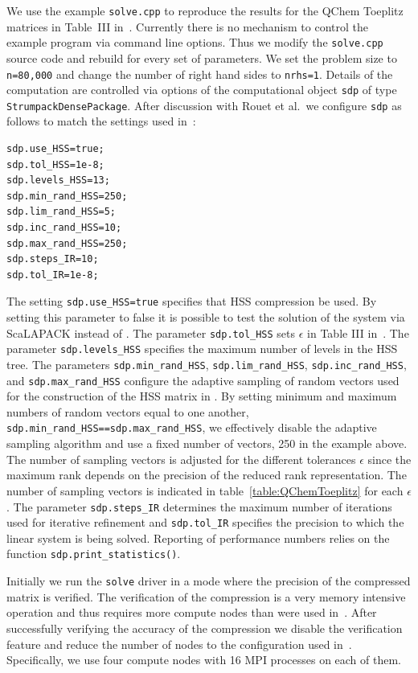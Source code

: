 \documentclass{acmsmall}
\begin{document}
We use the example \verb!solve.cpp! to reproduce the results for
the QChem Toeplitz matrices in Table~III
in~\cite{rouet:strumpack}.  Currently there is no mechanism to
control the example program via command line options.  Thus we
modify the \verb!solve.cpp! source code and rebuild for every set
of parameters.  We set the problem size to \verb!n=80,000! and
change the number of right hand sides to \verb!nrhs=1!.  Details
of the computation are controlled via options of the
computational object \verb!sdp! of type
\verb!StrumpackDensePackage!.  After discussion with Rouet et
al.\ we configure \verb!sdp! as follows to match the settings used
in~\cite{rouet:strumpack}:
\begin{verbatim}
sdp.use_HSS=true;
sdp.tol_HSS=1e-8;
sdp.levels_HSS=13;
sdp.min_rand_HSS=250;
sdp.lim_rand_HSS=5;
sdp.inc_rand_HSS=10;
sdp.max_rand_HSS=250;
sdp.steps_IR=10;
sdp.tol_IR=1e-8;
\end{verbatim}
The setting \verb!sdp.use_HSS=true! specifies that HSS
compression be used.  By setting this parameter to false it is
possible to test the solution of the system via ScaLAPACK instead
of \strumpack{}.  The parameter \verb!sdp.tol_HSS! sets
$\epsilon$ in Table III in~\cite{rouet:strumpack}.  The parameter
\verb!sdp.levels_HSS! specifies the maximum number of levels in
the HSS tree.  The parameters \verb!sdp.min_rand_HSS!,
\verb!sdp.lim_rand_HSS!, \verb!sdp.inc_rand_HSS!, and
\verb!sdp.max_rand_HSS! configure the adaptive sampling of random
vectors used for the construction of the HSS matrix in
\strumpack{}.  By setting minimum and maximum numbers of random
vectors equal to one another,
\verb!sdp.min_rand_HSS==sdp.max_rand_HSS!, we effectively disable
the adaptive sampling algorithm and use a fixed number of
vectors, 250 in the example above.  The number of sampling
vectors is adjusted for the different tolerances $\epsilon$ since
the maximum rank depends on the precision of the reduced rank
representation.  The number of sampling vectors is indicated in
table~\ref{table:QChemToeplitz} for each $\epsilon$.  The
parameter \verb!sdp.steps_IR! determines the maximum number of
iterations used for iterative refinement and \verb!sdp.tol_IR!
specifies the precision to which the linear system is being
solved.  Reporting of performance numbers relies on the
function \verb!sdp.print_statistics()!.

Initially we run the \verb!solve! driver in a mode where the
precision of the compressed matrix is verified.  The verification
of the compression is a very memory intensive operation and thus
requires more compute nodes than were used
in~\cite{rouet:strumpack}.  After successfully verifying the
accuracy of the compression we disable the verification feature
and reduce the number of nodes to the configuration used
in~\cite{rouet:strumpack}.  Specifically, we use four compute
nodes with 16 MPI processes on each of them.
\end{document}
